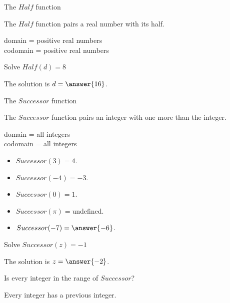 \documentclass{ximera}
\begin{document}
\newpage

\begin{example} The $Half$ function

The $Half$ function pairs a real number with its half.

domain = positive real numbers  \\ 
codomain = positive real numbers


Solve $Half(d) = 8$ 

The solution is $d = \answer{16}$.

\end{example} 







\begin{example} The $Successor$ function

The $Successor$ function pairs an integer with one more than the integer.

domain = all integers  \\ 
codomain = all integers


\begin{itemize}
\item $Successor(3) = 4$.
\item $Successor(-4) = -3$.
\item $Successor(0) = 1$.
\item $Successor(\pi) = $undefined.

\item $Successor(-7) = \answer{-6}$.
\end{itemize}


Solve $Successor(z) = -1$ 

The solution is $z = \answer{-2}$.

\end{example} 







\begin{question}  


Is every integer in the range of $Successor$?


\begin{multipleChoice}
\end{multipleChoice}
\begin{feedback}
Every integer has a previous integer.  
\end{feedback}
\end{question} 
\end{document}
